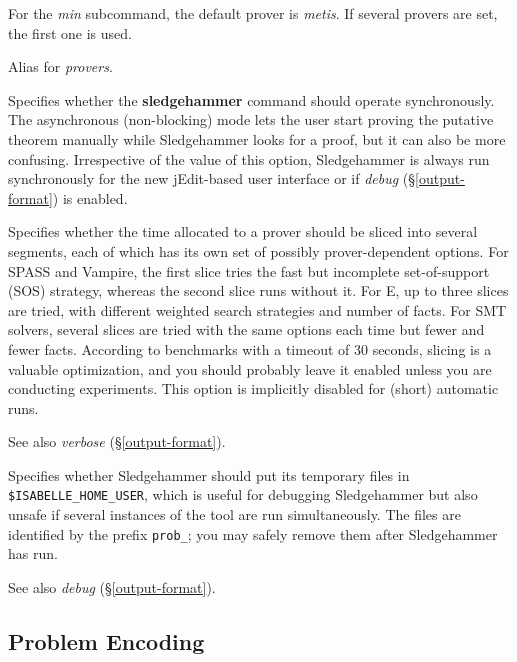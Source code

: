 \documentclass[a4paper,12pt]{article}
\begin{document}
\begin{enum}
For the \textit{min} subcommand, the default prover is \textit{metis}. If
several provers are set, the first one is used.

Alias for \textit{provers}.



Specifies whether the \textbf{sledgehammer} command should operate
synchronously. The asynchronous (non-blocking) mode lets the user start proving
the putative theorem manually while Sledgehammer looks for a proof, but it can
also be more confusing. Irrespective of the value of this option, Sledgehammer
is always run synchronously for the new jEdit-based user interface or if
\textit{debug} (\S\ref{output-format}) is enabled.

Specifies whether the time allocated to a prover should be sliced into several
segments, each of which has its own set of possibly prover-dependent options.
For SPASS and Vampire, the first slice tries the fast but incomplete
set-of-support (SOS) strategy, whereas the second slice runs without it. For E,
up to three slices are tried, with different weighted search strategies and
number of facts. For SMT solvers, several slices are tried with the same options
each time but fewer and fewer facts. According to benchmarks with a timeout of
30 seconds, slicing is a valuable optimization, and you should probably leave it
enabled unless you are conducting experiments. This option is implicitly
disabled for (short) automatic runs.

\nopagebreak
{\small See also \textit{verbose} (\S\ref{output-format}).}

Specifies whether Sledgehammer should put its temporary files in
\texttt{\$ISA\-BELLE\_\allowbreak HOME\_\allowbreak USER}, which is useful for
debugging Sledgehammer but also unsafe if several instances of the tool are run
simultaneously. The files are identified by the prefix \texttt{prob\_}; you may
safely remove them after Sledgehammer has run.

\nopagebreak
{\small See also \textit{debug} (\S\ref{output-format}).}
\end{enum}

\subsection{Problem Encoding}
\label{problem-encoding}
\end{document}

